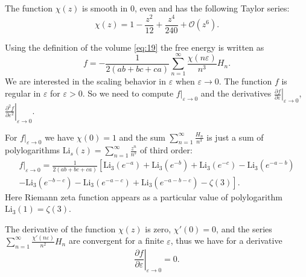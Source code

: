 \documentclass{article}
\newcommand{\Li}{\mathrm{Li}}
\begin{document}
The function $\chi(z)$ is smooth in 0, even and has the following Taylor series:
\begin{equation}
  \label{eq:45}
  \chi(z)=1 - \frac{z^2}{12} + \frac{z^4}{240}+\mathcal{O}(z^{6}).
\end{equation}

Using the definition of the volume \eqref{eq:19} the free energy is written as
\begin{equation}
  \label{eq:41}
  f=-\frac{1}{2(ab+bc+ca)} \sum _{n=1}^{\infty} \frac{\chi(n\varepsilon)}{n^{3}} H_{n}.
\end{equation}
We are interested in the scaling behavior in $\varepsilon$ when $\varepsilon\to 0$. The function $f$
is regular in $\varepsilon$ for $\varepsilon>0$. So we need to
compute  $\left.f\right|_{\varepsilon\to 0}$ and the derivatives $\left.\frac{\partial f}{\partial
  \varepsilon}\right|_{\varepsilon\to 0}$, $\left.\frac{\partial^{2} f}{\partial
  \varepsilon^{2}}\right|_{\varepsilon\to 0}$.

For $\left.f\right|_{\varepsilon\to 0}$ we have $\chi(0)=1$ and the sum $\sum_{n=1}^{\infty}
\frac{H_{n}}{n^{3}}$ is just a sum of  polylogarithms
$\mathrm{Li}_{s}(z)=\sum_{n=1}^{\infty}\frac{z^{n}}{n^{s}}$ of third order:
\begin{multline}
  \label{eq:42}
  \left.f\right|_{\varepsilon\to 0} =\frac{1}{2(ab+bc+ca)}\left[\Li_{3}(e^{-a})+\Li_{3}(e^{-b})+\Li_{3}(e^{-c})-
    \Li_{3}(e^{-a-b})\right.\\
  \left.-\Li_{3}(e^{-b-c})-    \Li_{3}(e^{-a-c})+    \Li_{3}(e^{-a-b-c})-\zeta(3)\right].
\end{multline}
Here Riemann zeta function appears as a particular value of polylogarithm $\Li_{3}(1)=\zeta(3)$.

The derivative of the function $\chi(z)$ is zero, $\chi'(0)=0$, and the series
$\sum_{n=1}^{\infty} \frac{\chi'(n\varepsilon)}{n^{2}}H_{n}$ are convergent for a finite
$\varepsilon$, thus we have for a derivative
\begin{equation}
  \label{eq:43}
\left.\frac{\partial f}{\partial \varepsilon}\right|_{\varepsilon\to 0}=0.
\end{equation}
\end{document}
